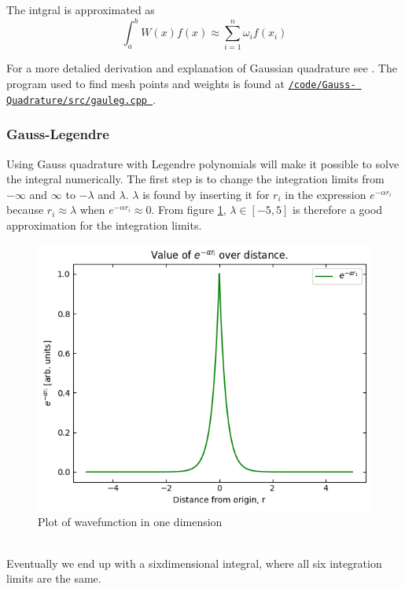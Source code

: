 \documentclass[../main.tex]{subfiles}
\begin{document}
The intgral is approximated as
\[\int_a^b W(x)f(x) \approx \sum_{i=1}^n \omega_i f(x_i) \]

For a more detalied derivation and explanation of Gaussian quadrature see \cite{MortenMC2019}. The program used to find mesh points and weights is found at \href{https://github.com/kmaasrud/Project-3/blob/master/code/Gauss-Quadrature/src/gauleg.cpp}{\texttt{/code/Gauss- Quadrature/src/gauleg.cpp
}}.

\subsubsection{Gauss-Legendre}\label{sec:GLQ}
Using Gauss quadrature with Legendre polynomials will make it possible to solve the integral numerically. The first step is to change the integration limits from  $-\infty$ and $\infty$ to $-\lambda$ and $\lambda$. $\lambda$ is found by inserting it for $r_i$ in the expression $e^{-\alpha r_i}$ because $r_i \approx \lambda$ when $e^{-\alpha r_i} \approx 0$. From figure \ref{fig:plot}, $\lambda \in [-5,5]$ is therefore a good approximation for the integration limits.

\begin{figure}[!h]
  \includegraphics[width=\textwidth]{img/expfunc_plot.png}
  \caption{Plot of wavefunction in one dimension}
  \label{fig:plot}
\end{figure}
\FloatBarrier \\

Eventually we end up with a sixdimensional integral, where all six integration limits are the same.
\end{document}
